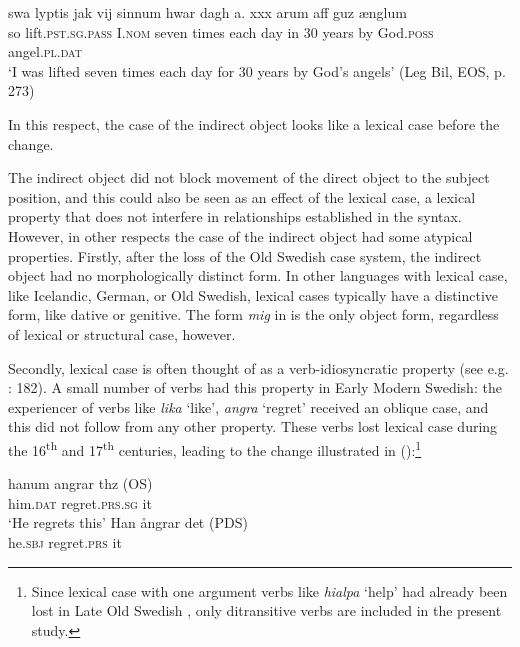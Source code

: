 \documentclass[output=paper]{langscibook}
\begin{document}
\ex\label{ex:falk:4b}
\gll swa  lyptis                                        jak               vij    sinnum  hwar  dagh  a.  xxx  arum  aff guz         ænglum\\
      so    lift.\textsc{pst}.\textsc{sg}.\textsc{pass}  I.\textsc{nom}  seven  times    each  day  in   30  years  by  God.\textsc{poss} angel.\textsc{pl.dat}\\
\glt ‘I was lifted seven times each day for 30 years by God’s angels’ (Leg Bil, EOS, p. 273)
    \z
    \z

In this respect, the case of the indirect object looks like a lexical case before the change. 


The indirect object did not block movement of the direct object to the subject position, and this could also be seen as an effect of the lexical case, a lexical property that does not interfere in relationships established in the syntax. However, in other respects the case of the indirect object had some atypical properties. Firstly, after the loss of the Old Swedish case system, the indirect object had no morphologically distinct form. In other languages with lexical case, like Icelandic, German, or Old Swedish, lexical cases typically have a distinctive form, like dative or genitive. The form \textit{mig} in  is the only object form, regardless of lexical or structural case, however.



Secondly, lexical case is often thought of as a verb-idiosyncratic property (see e.g. \citealt{Thrainsson2007}: 182). A small number of verbs had this property in Early Modern Swedish: the experiencer of verbs like \textit{lika} ‘like’, \textit{angra} ‘regret’ received an oblique case, and this did not follow from any other property. These verbs lost lexical case during the 16\textsuperscript{th} and 17\textsuperscript{th} centuries, leading to the change illustrated in  (\citealt{Lindqvist1912,Falk1997}):\footnote{Since lexical case with one argument verbs like \textit{hialpa} ‘help’ had already been lost in Late Old Swedish \citep{Falk1995}, only ditransitive verbs are included in the present study.}


\ea%
    \label{ex:falk:5}
\ea
\gll hanum    angrar        thz    (OS)\\
      him.\textsc{dat} regret.\textsc{prs.sg}  it\\
\glt ‘He regrets this’
\ex
\gll Han    ångrar    det     (PDS)\\
      he.\textsc{sbj}  regret.\textsc{prs}  it\\
\z
\z
\end{document}
